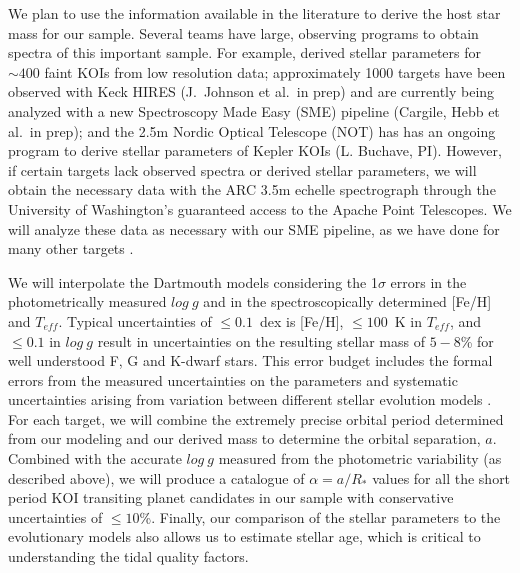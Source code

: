 We plan to use the information available in the literature to derive
the host star mass for our sample.  Several teams have large,
observing programs to obtain spectra of this important sample.  For
example, \citet{Everett2013} derived stellar parameters for $\sim 400$
faint KOIs from low resolution data; approximately 1000 targets have
been observed with Keck HIRES (J.~Johnson et al.\ in prep) and are
currently being analyzed with a new Spectroscopy Made Easy (SME)
pipeline (Cargile, Hebb et al.\ in prep); and the 2.5m Nordic Optical
Telescope (NOT) has has an ongoing program to derive stellar
parameters of Kepler KOIs (L. Buchave, PI).  However, if certain
targets lack observed spectra or derived stellar parameters, we will
obtain the necessary data with the ARC 3.5m echelle spectrograph
through the University of Washington's guaranteed access to the Apache
Point Telescopes.  We will analyze these data as necessary with our
SME pipeline, as we have done for many other
targets \citep[i.e.][]{Wisniewski2012}.

We will interpolate the Dartmouth models considering the 1$\sigma$
errors in the photometrically measured $log~g$ and in the
spectroscopically determined [Fe/H] and $T_{eff}$.  Typical
uncertainties of $\le 0.1$~dex is [Fe/H], $\le 100$~K in $T_{eff}$,
and $\le 0.1$ in $log~g$ result in uncertainties on the resulting
stellar mass of $5-8$\% for well understood F, G and K-dwarf stars.
This error budget includes the formal errors from the measured
uncertainties on the parameters and systematic uncertainties arising
from variation between different stellar evolution models
\citep[2-4\%;][]{Southworth2009}.  For each target, we will combine the
extremely precise orbital period determined from our modeling and our
derived mass to determine the orbital separation, $a$.  Combined with
the accurate $log~g$ measured from the photometric variability (as
described above), we will produce a catalogue of $\alpha = a/R_*$
values for all the short period KOI transiting planet candidates in
our sample with conservative uncertainties of $\le 10$\%.  Finally,
our comparison of the stellar parameters to the evolutionary models
also allows us to estimate stellar age, which is critical to
understanding the tidal quality factors.

\medskip
{\centerline{}}
\smallskip


